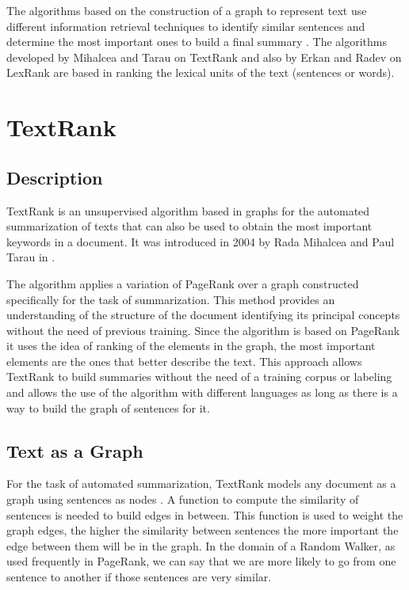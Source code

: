 \documentclass{llncs}
\begin{document}
The algorithms based on the construction of a graph to represent text use different information retrieval techniques to identify similar sentences and determine the most important ones to build a final summary \cite{salton}. The algorithms developed by Mihalcea and Tarau on TextRank \cite{mihalcea-tarau} and also by Erkan and Radev on LexRank \cite{erkan} are based in ranking the lexical units of the text (sentences or words).

\section{TextRank}

\subsection{Description}
TextRank is an unsupervised algorithm based in graphs for the automated summarization of texts that can also be used to obtain the most important keywords in a document. It was introduced in 2004 by Rada Mihalcea and Paul Tarau in \cite{mihalcea-tarau}.

The algorithm applies a variation of PageRank \cite{pageetal98} over a graph constructed specifically for the task of summarization. This method provides an understanding of the structure of the document identifying its principal concepts without the need of previous training. Since the algorithm is based on PageRank it uses the idea of ranking of the elements in the graph, the most important elements are the ones that better describe the text. This approach allows TextRank to build summaries without the need of a training corpus or labeling and allows the use of the algorithm with different languages as long as there is a way to build the graph of sentences for it.

\subsection{Text as a Graph}
For the task of automated summarization, TextRank models any document as a graph using sentences as nodes \cite{introductionir}. A function to compute the similarity of sentences is needed to build edges in between. This function is used to weight the graph edges, the higher the similarity between sentences the more important the edge between them will be in the graph. In the domain of a Random Walker, as used frequently in PageRank, we can say that we are more likely to go from one sentence to another if those sentences are very similar. 
\end{document}
